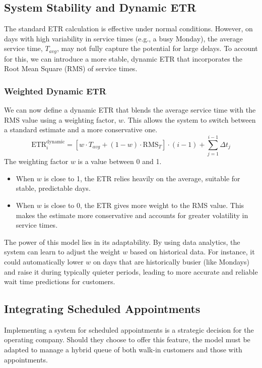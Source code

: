 \documentclass{article}
\begin{document}
\subsection{System Stability and Dynamic ETR}
The standard ETR calculation is effective under normal conditions. However, on days with high variability in service times (e.g., a busy Monday), the average service time, $T_{avg}$, may not fully capture the potential for large delays. To account for this, we can introduce a more stable, dynamic ETR that incorporates the Root Mean Square (RMS) of service times.

\subsubsection{Weighted Dynamic ETR}
We can now define a dynamic ETR that blends the average service time with the RMS value using a weighting factor, $w$. This allows the system to switch between a standard estimate and a more conservative one.
\begin{equation}
    \text{ETR}_i^{\text{dynamic}} = \left[ w \cdot T_{avg} + (1 - w) \cdot \text{RMS}_T \right] \cdot (i - 1) + \sum_{j=1}^{i-1} \Delta t_j
\end{equation}
The weighting factor $w$ is a value between 0 and 1.
\begin{itemize}
    \item When $w$ is close to 1, the ETR relies heavily on the average, suitable for stable, predictable days.
    \item When $w$ is close to 0, the ETR gives more weight to the RMS value. This makes the estimate more conservative and accounts for greater volatility in service times.
\end{itemize}
The power of this model lies in its adaptability. By using data analytics, the system can learn to adjust the weight $w$ based on historical data. For instance, it could automatically lower $w$ on days that are historically busier (like Mondays) and raise it during typically quieter periods, leading to more accurate and reliable wait time predictions for customers.

\subsection{Integrating Scheduled Appointments}
Implementing a system for scheduled appointments is a strategic decision for the operating company. Should they choose to offer this feature, the model must be adapted to manage a hybrid queue of both walk-in customers and those with appointments. 
\end{document}
